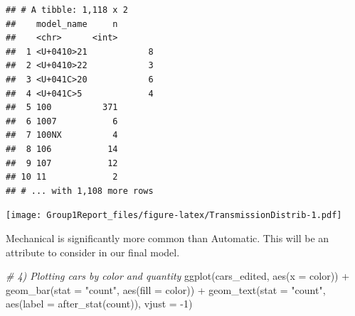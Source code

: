 \documentclass[
]{article}
\newenvironment{Shaded}{\begin{snugshade}}{\end{snugshade}}
\newcommand{\AttributeTok}[1]{\textcolor[rgb]{0.77,0.63,0.00}{#1}}
\newcommand{\CommentTok}[1]{\textcolor[rgb]{0.56,0.35,0.01}{\textit{#1}}}
\newcommand{\DecValTok}[1]{\textcolor[rgb]{0.00,0.00,0.81}{#1}}
\newcommand{\FloatTok}[1]{\textcolor[rgb]{0.00,0.00,0.81}{#1}}
\newcommand{\FunctionTok}[1]{\textcolor[rgb]{0.00,0.00,0.00}{#1}}
\newcommand{\NormalTok}[1]{#1}
\newcommand{\OtherTok}[1]{\textcolor[rgb]{0.56,0.35,0.01}{#1}}
\newcommand{\SpecialCharTok}[1]{\textcolor[rgb]{0.00,0.00,0.00}{#1}}
\newcommand{\StringTok}[1]{\textcolor[rgb]{0.31,0.60,0.02}{#1}}
\begin{document}
\begin{verbatim}
## # A tibble: 1,118 x 2
##    model_name     n
##    <chr>      <int>
##  1 <U+0410>21            8
##  2 <U+0410>22            3
##  3 <U+041C>20            6
##  4 <U+041C>5             4
##  5 100          371
##  6 1007           6
##  7 100NX          4
##  8 106           14
##  9 107           12
## 10 11             2
## # ... with 1,108 more rows
\end{verbatim}

\begin{Shaded}
\end{Shaded}

\texttt{[image: Group1Report\_files/figure-latex/TransmissionDistrib-1.pdf]}

Mechanical is significantly more common than Automatic. This will be an
attribute to consider in our final model.

\begin{Shaded}
\begin{Highlighting}[]
\CommentTok{\# 4) Plotting cars by color and quantity}
\FunctionTok{ggplot}\NormalTok{(cars\_edited, }\FunctionTok{aes}\NormalTok{(}\AttributeTok{x =}\NormalTok{ color)) }\SpecialCharTok{+} \FunctionTok{geom\_bar}\NormalTok{(}\AttributeTok{stat =} \StringTok{"count"}\NormalTok{, }\FunctionTok{aes}\NormalTok{(}\AttributeTok{fill =}\NormalTok{ color)) }\SpecialCharTok{+} \FunctionTok{geom\_text}\NormalTok{(}\AttributeTok{stat =} \StringTok{"count"}\NormalTok{, }\FunctionTok{aes}\NormalTok{(}\AttributeTok{label =} \FunctionTok{after\_stat}\NormalTok{(count)), }\AttributeTok{vjust =} \SpecialCharTok{{-}}\DecValTok{1}\NormalTok{)}
\end{Highlighting}
\end{Shaded}
\end{document}

